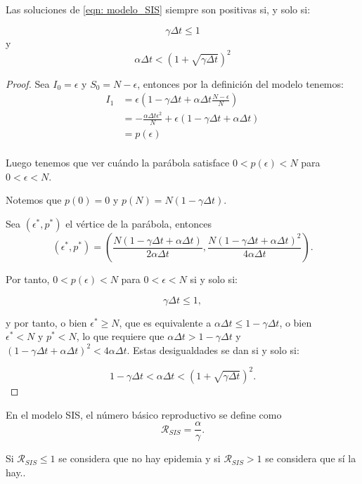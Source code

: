 \begin{proposition}
Las soluciones de \eqref{eqn: modelo_SIS} siempre son positivas si, y solo si:

$$\gamma \Delta t \leq 1 $$ y $$\alpha\Delta t< \left( 1+\sqrt{\gamma \Delta t} \right)^2$$

\end{proposition}
\begin{proof}
Sea $I_0=\epsilon$ y $S_0=N-\epsilon$, entonces por la definición del modelo tenemos:
\begin{equation}
\begin{aligned}
I_1 & =\epsilon\left(1-\gamma\Delta t+\alpha\Delta t\frac{N-\epsilon}{N}\right) \\
& = -\frac{\alpha\Delta t \epsilon^2}{N} + \epsilon(1-\gamma\Delta t+\alpha\Delta t ) \\
& = p(\epsilon) \\
\end{aligned}
\end{equation}

Luego tenemos que ver cuándo la parábola satisface $0<p(\epsilon)<N$ para $0<\epsilon<N$.

Notemos que $p(0)=0$ y $p(N)=N(1-\gamma\Delta t).$

Sea $(\epsilon^*, p^*)$ el vértice de la parábola, entonces 
$$(\epsilon^*, p^*) = \left(\frac{N(1-\gamma\Delta t+\alpha\Delta t)}{2\alpha\Delta t}, \frac{N(1-\gamma\Delta t+\alpha\Delta t)^2}{4\alpha\Delta t}\right).$$

Por tanto, $0<p(\epsilon )<N$ para $0<\epsilon <N$ si y solo si:

$$\gamma\Delta t \leq 1,$$

y por tanto, o bien $\epsilon^* \geq N$, que es equivalente a $\alpha\Delta t \leq 1-\gamma\Delta t$, o bien $\epsilon^*<N \text{  y  } p^*<N$, lo que requiere que $\alpha\Delta t > 1-\gamma\Delta t$ y $(1-\gamma\Delta t+\alpha\Delta t)^2<4\alpha\Delta t$. Estas desigualdades se dan si y solo si:

$$1-\gamma\Delta t < \alpha \Delta t < \left( 1+\sqrt{\gamma \Delta t} \right)^2.$$

\end{proof}

En el modelo SIS, el número básico reproductivo se define como 
$$\mathcal{R}_{SIS}=\frac{\alpha}{\gamma}.$$

Si $\mathcal{R}_{SIS}\leq 1$ se considera que no hay epidemia y si $\mathcal{R}_{SIS}>1$ se considera que sí la hay..

